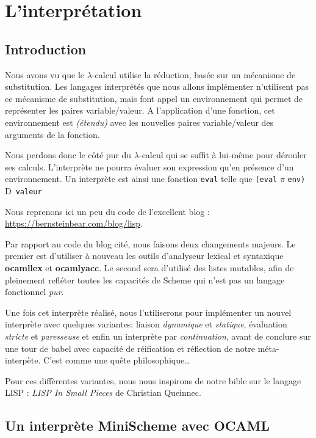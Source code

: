 \documentclass[11pt]{book}
\newcommand{\imp}{{\letterimp D}\hspace{0.1cm}}
\begin{document}
\chapter{L'interprétation}


\section{Introduction}
Nous avons vu que le $\lambda$-calcul utilise la réduction, basée sur un mécanisme de substitution.
Les langages interprétés que nous allons implémenter n'utilisent pas ce mécanisme de substitution, mais
font appel un environnement qui permet de représenter les paires variable/valeur.
A l'application d'une fonction, cet environnement est \textit{(étendu)} avec les nouvelles paires variable/valeur
des arguments de la fonction.

Nous perdons donc le côté  pur du $\lambda$-calcul qui se suffit à lui-même pour
dérouler ses calculs.
L'interprète ne pourra évaluer son expression qu'en présence d'un environnement.
Un interprète est ainsi  une fonction \verb+eval+ telle que \verb+(eval+ $\pi$ \verb+env)+ \imp\  \verb+valeur+


Nous reprenons ici  un peu du code de l'excellent blog :
\url{https://bernsteinbear.com/blog/lisp}.


Par rapport au code du blog cité, nous faisons deux changements majeurs. Le premier est d'utiliser à nouveau
les outils d'analyseur lexical et syntaxique \textbf{ocamllex} et \textbf{ocamlyacc}. 
Le second sera d'utilisé des listes mutables, afin de pleinement refléter toutes les capacités de Scheme qui n'est
pas un langage fonctionnel \textit{pur}.

Une fois cet interprète réalisé, nous l'utiliserons pour implémenter un nouvel interprète avec quelques variantes:
liaison \textit{dynamique} et \textit{statique}, évaluation \textit{stricte} et \textit{paresseuse} 
et enfin un interprète par \textit{continuation}, avant de conclure sur une tour de babel avec capacité de réification
et réflection de notre méta-interpète. C'est comme une quête philosophique\dots


Pour ces diffèrentes variantes, nous nous inspirons de notre bible sur le langage LISP : \textit{LISP In Small Pieces} de Christian Queinnec.
\cite{lisp}

\section{Un interprète MiniScheme avec OCAML}
\end{document}
